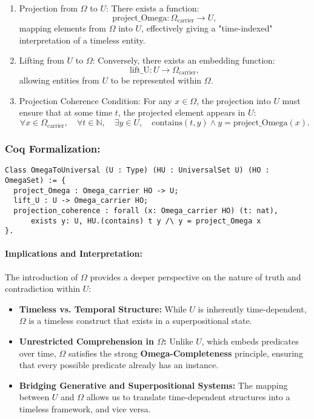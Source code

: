\documentclass[12pt]{article}
\begin{document}
\begin{enumerate}
    \item Projection from \( \Omega \) to \( U \): There exists a function:
    \[
    \text{project\_Omega}: \Omega_{\text{carrier}} \to U,
    \]
    mapping elements from \( \Omega \) into \( U \), effectively giving a "time-indexed" interpretation of a timeless entity.
    \item Lifting from \( U \) to \( \Omega \): Conversely, there exists an embedding function:
    \[
    \text{lift\_U}: U \to \Omega_{\text{carrier}},
    \]
    allowing entities from \( U \) to be represented within \( \Omega \).
    \item Projection Coherence Condition: For any \( x \in \Omega \), the projection into \( U \) must ensure that at some time \( t \), the projected element appears in \( U \):
    \begin{equation}
        \forall x \in \Omega_{\text{carrier}}, \quad \forall t \in \mathbb{N}, \quad
        \exists y \in U, \quad \text{contains}(t, y) \wedge y = \text{project\_Omega}(x).
    \end{equation}
\end{enumerate}

\subsubsection{Coq Formalization:}
\begin{lstlisting}[language=Coq]
Class OmegaToUniversal (U : Type) (HU : UniversalSet U) (HO : OmegaSet) := {
  project_Omega : Omega_carrier HO -> U;
  lift_U : U -> Omega_carrier HO;
  projection_coherence : forall (x: Omega_carrier HO) (t: nat),
      exists y: U, HU.(contains) t y /\ y = project_Omega x
}.
\end{lstlisting}

\paragraph{Implications and Interpretation:}
The introduction of \( \Omega \) provides a deeper perspective on the nature of truth and contradiction within \( U \):

\begin{itemize}
    \item \textbf{Timeless vs. Temporal Structure:} While \( U \) is inherently time-dependent, \( \Omega \) is a timeless construct that exists in a superpositional state.
    \item \textbf{Unrestricted Comprehension in \( \Omega \):} Unlike \( U \), which embeds predicates over time, \( \Omega \) satisfies the strong \textbf{Omega-Completeness} principle, ensuring that every possible predicate already has an instance.
    \item \textbf{Bridging Generative and Superpositional Systems:} The mapping between \( U \) and \( \Omega \) allows us to translate time-dependent structures into a timeless framework, and vice versa.
\end{itemize}
\end{document}

